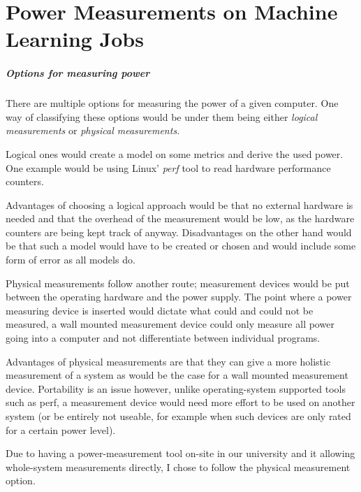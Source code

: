 \chapter{Power Measurements on Machine Learning Jobs}
\label{sec:power_measurements}


\paragraph{Options for measuring power}

There are multiple options for measuring the power of a given computer. One way of classifying these options would be under them being either \emph{logical measurements} or \emph{physical measurements}.

Logical ones would create a model on some metrics and derive the used power. One example would be using Linux' \emph{perf} tool to read hardware performance counters. 

Advantages of choosing a logical approach would be that no external hardware is needed and that the overhead of the measurement would be low, as the hardware counters are being kept track of anyway. Disadvantages on the other hand would be that such a model would have to be created or chosen and would include some form of error as all models do.

Physical measurements follow another route; measurement devices would be put between the operating hardware and the power supply. The point where a power measuring device is inserted would dictate what could and could not be measured, a wall mounted measurement device could only measure all power going into a computer and not differentiate between individual programs.

Advantages of physical measurements are that they can give a more holistic measurement of a system as would be the case for a wall mounted measurement device. Portability is an issue however, unlike operating-system supported tools such as perf, a measurement device would need more effort to be used on another system (or be entirely not useable, for example when such devices are only rated for a certain power level).

Due to having a power-measurement tool on-site in our university and it allowing whole-system measurements directly, I chose to follow the physical measurement option. 


